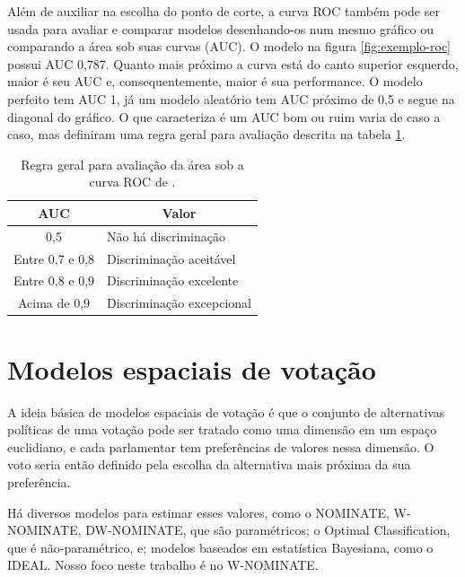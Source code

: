 \documentclass[a4paper,titlepage]{ppgi}\usepackage[]{graphicx}\usepackage[]{color}
\begin{document}
Além de auxiliar na escolha do ponto de corte, a curva ROC também pode ser
usada para avaliar e comparar modelos desenhando-os num mesmo gráfico ou
comparando a área sob suas curvas (AUC). O modelo na figura
\ref{fig:exemplo-roc} possui AUC 0,787. Quanto mais próximo a curva está do
canto superior esquerdo, maior é seu AUC e, consequentemente, maior é sua
performance. O modelo perfeito tem AUC 1, já um modelo aleatório tem AUC
próximo de 0,5 e segue na diagonal do gráfico. O que caracteriza é um AUC bom
ou ruim varia de caso a caso, mas  definiram uma regra
geral para avaliação descrita na tabela \ref{table:valores-auc}.

\begin{table}
\centering
\begin{tabular}{c l}
  AUC & \multicolumn{1}{c}{Valor} \\
  \hline
  0,5 & Não há discriminação \\
  Entre 0,7 e 0,8 & Discriminação aceitável \\
  Entre 0,8 e 0,9 & Discriminação excelente \\
  Acima de 0,9 & Discriminação excepcional \\
\end{tabular}
\caption{Regra geral para avaliação da área sob a curva ROC de .}
\label{table:valores-auc}
\end{table}





\section{Modelos espaciais de votação}



A ideia básica de modelos espaciais de votação é que o conjunto de alternativas
políticas de uma votação pode ser tratado como uma dimensão em um espaço
euclidiano, e cada parlamentar tem preferências de valores nessa dimensão. O
voto seria então definido pela escolha da alternativa mais próxima da sua
preferência.

Há diversos modelos para estimar esses valores, como o NOMINATE, W-NOMINATE,
DW-NOMINATE, que são paramétricos; o Optimal Classification, que é
não-paramétrico, e; modelos baseados em estatística Bayesiana, como o IDEAL.
Nosso foco neste trabalho é no W-NOMINATE.
\cite{Poole2000,Poole2005,Poole2014,Jackman2000,Clinton2004}
\end{document}
